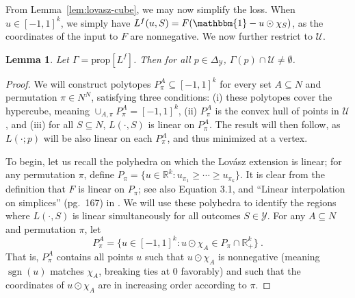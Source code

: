 \documentclass[12pt]{article}
\newcommand{\reals}{\mathbb{R}}
\newcommand{\prop}[1]{\mathrm{prop}[#1]}
\newcommand{\simplex}{\Delta_\Y}
\newcommand{\U}{\mathcal{U}}
\newcommand{\Y}{\mathcal{Y}}
\newcommand{\ones}{\mathbbm{1}}
\DeclareMathOperator*{\sgn}{sgn}
\newtheorem{lemma}{Lemma}
\begin{document}
From Lemma~\ref{lem:lovasz-cube}, we may now simplify the loss.
When $u\in[-1,1]^k$, we simply have $L^f(u,S) = F(\ones - u \odot \chi_S)$, as the coordinates of the input to $F$ are nonnegative.
We now further restrict to $\U$.

\begin{lemma}
	\label{lem:lovasz-trim}
	Let $\Gamma = \prop{L^f}$.
	Then for all $p\in\simplex$, $\Gamma(p) \cap \U \neq \emptyset$.
\end{lemma}
\begin{proof}
	We will construct polytopes $P^A_\pi \subseteq [-1,1]^k$ for every set $A\subseteq N$ and permutation $\pi \in N^N$, satisfying three conditions: (i) these polytopes cover the hypercube, meaning $\cup_{A,\pi} P^A_\pi = [-1,1]^k$, (ii) $P^A_\pi$ is the convex hull of points in $\U$, and (iii) for all $S\subseteq N$, $L(\cdot,S)$ is linear on $P^A_\pi$.
	The result will then follow, as $L(\cdot;p)$ will be also linear on each $P^A_\pi$, and thus minimized at a vertex.
	
	To begin, let us recall the polyhedra on which the Lov\'asz extension is linear; for any permutation $\pi$, define $P_\pi = \{u\in\reals^k : u_{\pi_1} \geq \cdots \geq u_{\pi_k}\}$.
	It is clear from the definition that $F$ is linear on $P_\pi$; see also Equation 3.1, and ``Linear interpolation on simplices'' (pg.\ 167) in \citet{bach2013learning}.
	We will use these polyhedra to identify the regions where $L(\cdot,S)$ is linear simultaneously for all outcomes $S\in\Y$.
	For any $A\subseteq N$ and permutation $\pi$, let
	\begin{equation}
	\label{eq:poly-pi}
	P^A_\pi = \{u\in[-1,1]^k : u \odot \chi_A \in P_\pi \cap \reals^k_+\}~.
	\end{equation}
	That is, $P^A_\pi$ contains all points $u$ such that $u \odot \chi_A$ is nonnegative (meaning $\sgn(u)$ matches $\chi_A$, breaking ties at $0$ favorably) and such that the coordinates of $u \odot \chi_A$ are in increasing order according to $\pi$.
	

\end{proof}
\end{document}

